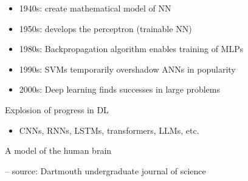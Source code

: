 \begin{frame}


    \begin{itemize}
        \item 1940s:  create mathematical model of NN
        \vspace{0.5em}
        \item 1950s:  develops the perceptron (trainable NN)
        \vspace{0.5em}
        \item 1980s: Backpropagation algorithm enables training of MLPs
        \vspace{0.5em}
        \item 1990s: SVMs temporarily overshadow ANNs in popularity
        \vspace{0.5em}
        \item 2000s: Deep learning finds successes in large problems
    \end{itemize}
    
        \vspace{0.5em}
        \vspace{0.5em}
     Explosion of progress in DL

    \begin{itemize}
        \item CNNs, RNNs, LSTMs, transformers, LLMs, etc.
    \end{itemize}

\end{frame}

\begin{frame}{A model of the human brain}
    
    \begin{figure}
       \centering
    \end{figure}

    \footnotesize{
    \hspace{5em} -- source: Dartmouth undergraduate journal of science}

\end{frame}


